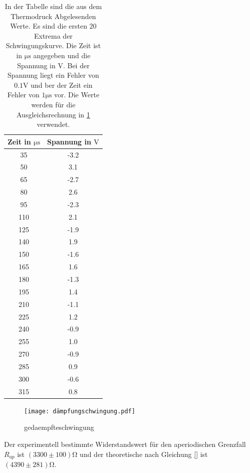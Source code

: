 \begin{table}
  \centering
  \begin{tabular}{c c}
    \toprule
    Zeit in $\si{\micro\second}$ & Spannung in $\si{\volt}$  \\
    \midrule
     35  &  -3.2  \\
     50  &   3.1  \\
     65  &  -2.7  \\
     80  &   2.6  \\
     95  &  -2.3  \\
    110  &   2.1  \\
    125  &  -1.9  \\
    140  &   1.9  \\
    150  &  -1.6  \\
    165  &   1.6  \\
    180  &  -1.3  \\
    195  &   1.4  \\
    210  &  -1.1  \\
    225  &   1.2  \\
    240  &  -0.9  \\
    255  &   1.0  \\
    270  &  -0.9  \\
    285  &   0.9  \\
    300  &  -0.6  \\
    315  &   0.8  \\
    \bottomrule
  \end{tabular}
  \caption{In der Tabelle sind die aus dem Thermodruck Abgelesenden Werte.
           Es sind die ersten $20$ Extrema der Schwingungskurve. Die Zeit ist
            in  $\si{\micro\second}$ angegeben und die Spannung in $\si{\volt}$.
            Bei der Spannung liegt ein Fehler von $0.1\si{\volt}$ und ber der Zeit
            ein Fehler von $1\si{\micro\second}$ vor.
           Die Werte werden für die Ausgleichsrechnung in \ref{fig:gedaempfteschwingung}
           verwendet.}
\end{table}
\begin{figure}
  \centering
  \texttt{[image: dämpfungschwingung.pdf]}
  \caption{gedaempfteschwingung}
  \label{fig:gedaempfteschwingung}
\end{figure}

Der experimentell bestimmte Widerstandswert für den aperiodischen Grenzfall
$R_{ap}$ ist $(3300\pm100)\si{\ohm}$ und der theoretische nach Gleichung \eqref{}
ist $(4390\pm281)\si{\ohm}$.

